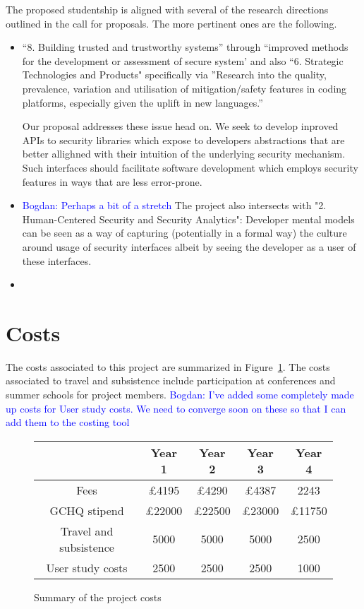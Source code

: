 \documentclass[10pt]{article}
\newcommand{\bw}[1]{{\textcolor{blue} {Bogdan: #1}}}
\begin{document}
The proposed studentship is aligned with several of the research directions outlined in the call for proposals. The more pertinent ones are the following. 

\begin{itemize}
\item ``8. Building trusted and trustworthy systems'' through ``improved methods for the development or assessment of secure system' and also 
``6. Strategic Technologies and Products" specifically via ''Research into the quality, prevalence, variation and utilisation of mitigation/safety features in coding platforms, especially given the uplift in new languages.'' 

Our proposal addresses these issue head on. We seek to develop inproved APIs to security libraries which expose to developers abstractions that are better allighned with their intuition of the underlying security mechanism.  Such interfaces should facilitate software development which employs security features in ways that are less error-prone. 
\item \bw{Perhaps a bit of a stretch} The project also intersects with  "2. Human-Centered Security and Security Analytics": Developer mental models can be seen as a way of capturing (potentially in a formal way) the culture around usage of security interfaces albeit by seeing the developer as a user of these interfaces. 
\item 
\end{itemize} 








 


\section{Costs}
The costs associated to this project are summarized in Figure~\ref{fig:costs}.  
The costs associated to travel and subsistence include participation at conferences and summer schools for project members.
\bw{I've added some completely made up costs for User study costs. We need to converge soon on these so that I can add them to the costing tool}
\begin{figure}[h!t]
\begin{center}
\begin{tabular}{|c|c|c|c|c|}
\hline 
& {\bf Year 1} &{\bf Year 2}&{\bf Year 3}&{\bf Year 4}\\
\hline
Fees & £4195 & £4290 & £4387 & 2243 \\
\hline
GCHQ stipend & £22000 & £22500 & £23000 & £11750 \\
\hline
Travel and subsistence & 5000 & 5000 & 5000 & 2500 \\
\hline
User study costs & 2500 & 2500 & 2500 & 1000 \\
\hline
\end{tabular}
\end{center}
\caption{Summary of the project costs}
\label{fig:costs}
\end{figure}

%
%
%
%
\small


\end{document}
